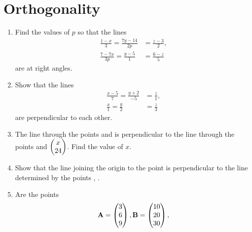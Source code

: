 \documentclass[journal,12pt,twocolumn]{IEEEtran}
\renewcommand\thesection{\arabic{section}}
\begin{document}
\section{Orthogonality}
\renewcommand{\theequation}{\theenumi}
\begin{enumerate}[label=\thesection.\arabic*.,ref=\thesection.\theenumi]
\item Find the values of $p$ so that the lines 
\begin{align}
\frac{1-x}{3} = \frac{7y-14}{2p} &= \frac{z-3}{2}, 
\\
\frac{7-7x}{3p} = \frac{y-5}{1} &= \frac{6-z}{5} 
\end{align}
are at right angles.
\\
\solution

\item Show that the lines 
\begin{align}
\frac{x-5}{7} = \frac{y+2}{-5} &= \frac{z}{1}, 
\\
\frac{x}{1} = \frac{y}{2} &= \frac{z}{3} 
\end{align}
%
are perpendicular to each other.
\\
\solution

\item The line through the points  and  is perpendicular to the line through the points  and $\begin{pmatrix}x\\24\end{pmatrix}$.  Find the value of $x$.
\\
\solution
%
\item Show that the line joining the origin to the point  is perpendicular to the line determined by the points , .
\\
\solution
%
\item Are the points 
\begin{align}
\vec{A} = \myvec{3\\6 \\9},
\vec{B} = \myvec{10\\20 \\30},

\end{align}
\end{enumerate}
\end{document}
